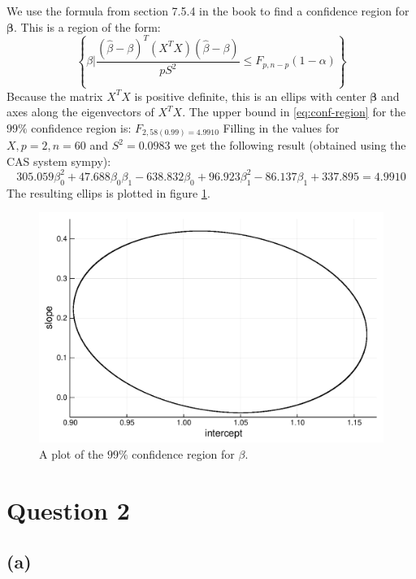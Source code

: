 \documentclass[a4paper]{article}
\begin{document}
We use the formula from section 7.5.4 in the book to find a confidence region for $\mathbf{\beta}$. This is a region of the form:
\begin{equation}
	\left\{ \beta \bigg| \frac{(\hat{\beta}-\beta)^T (X^TX) (\hat{\beta}-\beta)}{pS^2} \leq F_{p,n-p}(1-\alpha) \right\}
	\label{eq:conf-region}
\end{equation}
Because the matrix $X^TX$ is positive definite, this is an ellips with center $\mathbf{\beta}$ and axes along the eigenvectors of $X^TX$. The upper bound in \ref{eq:conf-region} for the $99\%$ confidence region is: $F_{2,58(0.99) = 4.9910}$ Filling in the values for $X, p=2, n=60$ and $S^2=0.0983$ we get the following result (obtained using the CAS system sympy):
\begin{equation*}
	305.059 \beta_{0}^{2} + 47.688 \beta_{0} \beta_{1} - 638.832 \beta_{0} + 96.923 \beta_{1}^{2} - 86.137 \beta_{1} + 337.895 = 4.9910
\end{equation*}
The resulting ellips is plotted in figure \ref{fig:1e}.
\begin{figure}        
	\centering
        \includegraphics[width=.9\linewidth]{region-1e.pdf}
        \caption{A plot of the $99\%$ confidence region for $\beta$.}
        \label{fig:1e}
\end{figure}


\newpage
\section*{Question 2}

\subsection*{(a)}
\noindent {}
\end{document}
